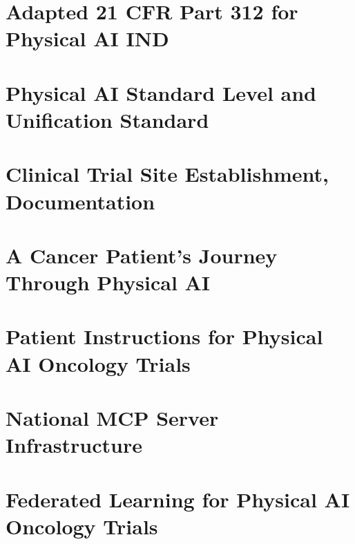 \documentclass[a4paper,12pt,twoside]{article}
\begin{document}
\section{Adapted 21 CFR Part 312 for Physical AI IND}
\label{sec:cfr312}

\newpage

\section{Physical AI Standard Level and Unification Standard}
\label{sec:psl-usl}

\newpage

\section{Clinical Trial Site Establishment, Documentation}
\label{sec:site-establishment}

\newpage

\section{A Cancer Patient's Journey Through Physical AI}
\label{sec:patient-journey}

\newpage

\section{Patient Instructions for Physical AI Oncology Trials}
\label{sec:patient-instructions}

\newpage

\section{National MCP Server Infrastructure}
\label{sec:national-mcp}

\newpage

\section{Federated Learning for Physical AI Oncology Trials}
\label{sec:federated-learning}

\newpage
\end{document}
